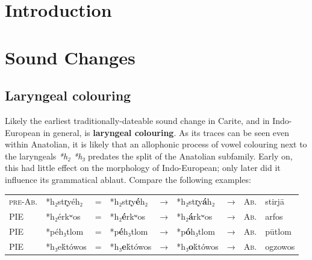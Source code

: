 \documentclass[svgnames,x11names,b5paper]{book}
\begin{document}


\newpage

\tableofcontents
\clearpage

\section{Introduction}

\section{Sound Changes}

            \subsection{Laryngeal colouring}
        
        Likely the earliest traditionally-dateable sound change in Carite, and in Indo-European in general, is \textbf{laryngeal colouring}. As its traces can be seen even within Anatolian, it is likely that an allophonic process of vowel colouring next to the laryngeals \textit{*h₂ *h₃} predates the split of the Anatolian subfamily. Early on, this had little effect on the morphology of Indo-European; only later did it influence its grammatical ablaut. Compare the following examples:

            \begin{table}[H]
                \begin{center}
                \begin{tabular}{llcllllll}
                \textsc{pre-Ab.} & *h₂str̥yéh₂ & = & *h₂str̥y\textbf{é}h₂ & → & *h₂str̥y\textbf{á}h₂ & → & \textsc{Ab.} & stirjā\\
                \textsc{PIE} & *h₂érkʷos & = & *h₂\textbf{é}rkʷos & → & *h₂\textbf{á}rkʷos & → & \textsc{Ab.} & arfos\\
                \textsc{PIE} & *péh₃tlom & = & *p\textbf{é}h₃tlom & → & *p\textbf{ó}h₃tlom & → & \textsc{Ab.} & pūtlom\\
                \textsc{PIE} & *h₃eḱtówos & = & *h₃\textbf{e}ḱtówos & → & *h₃\textbf{o}ḱtówos & → & \textsc{Ab.} & ogzowos\\
                \end{tabular}
                \end{center}
                \end{table}
        
\end{document}
